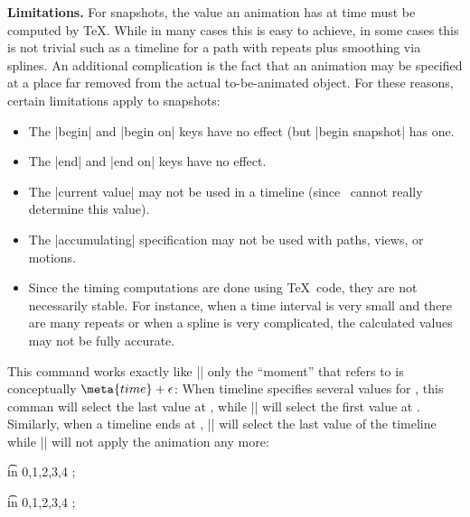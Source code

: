 \begin{command}{\pgfsnapshot{}}
  \medskip\textbf{Limitations.}
  For snapshots, the value an animation has at time  must
  be computed by \TeX. While in many cases this is easy to achieve, in
  some cases this is not trivial such as a timeline for a path with
  repeats plus smoothing via splines. An additional complication is
  the fact that an animation may be specified at a place far removed
  from the actual to-be-animated object. For these reasons, certain
  limitations apply to snapshots:
  \begin{itemize}
  \item The |begin| and |begin on| keys have no effect (but
    |begin snapshot| has one.
  \item The |end| and |end on| keys have no effect.
  \item The |current value| may not be used in a timeline (since
    \pgfname\ cannot really determine this value).
  \item The |accumulating| specification may not be used with paths,
    views, or motions.
  \item Since the timing computations are done using \TeX\ code, they
    are not necessarily stable. For instance, when a time interval is
    very small and there are many repeats or when a spline is very
    complicated, the calculated values may not be fully accurate. 
  \end{itemize}
\end{command}


\begin{command}{\pgfsnapshotafter{}}
  This command works exactly like |\pgfsnapshot| only the ``moment''
  that  refers to is conceptually $\meta{time} +
  \epsilon$: When timeline specifies several values for ,
  this comman will select the last value at , while
  |\pgfsnapshot| will select the first value at
  . Similarly, when a timeline ends at ,
  |\pgfsnapshot| will select the last value of the timeline while
  |\pgfsnapshotafter| will not apply the animation any more:
  
\begin{codeexample}[]
\foreach \t in {0,1,2,3,4} {
  \pgfsnapshot{\t}
  \tikz [animate me = {
      :rotate = { 0s = "0", 2s = "90", 2s = "180", 4s = "270" } }]
    ; }
\end{codeexample}
\begin{codeexample}[]
\foreach \t in {0,1,2,3,4} {
  \pgfsnapshotafter{\t}
  \tikz [animate me = {
      :rotate = { 0s = "0", 2s = "90", 2s = "180", 4s = "270" } }]
    ; }
\end{codeexample}
\end{command}



